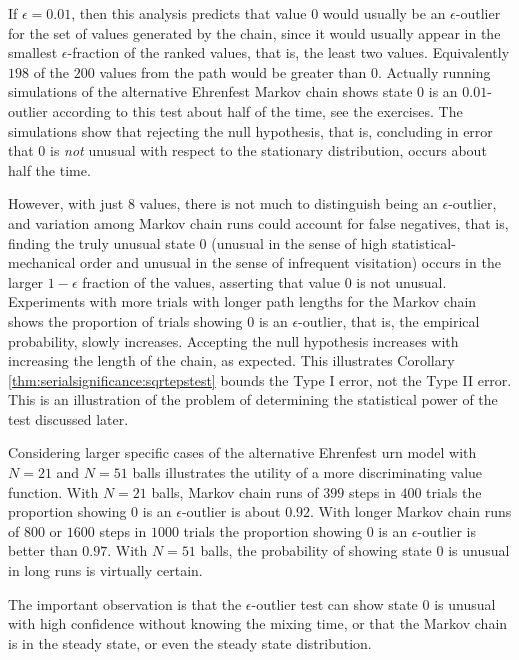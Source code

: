 \documentclass[12pt]{article}
\begin{document}
\begin{example}
    If \( \epsilon = 0.01 \), then this analysis predicts that value \(
    0 \) would usually be an \( \epsilon \)-outlier for the set of
    values generated by the chain, since it would usually appear in the
    smallest \( \epsilon \)-fraction of the ranked values, that is, the
    least two values.  Equivalently \( 198 \) of the \( 200 \) values
    from the path would be greater than \( 0 \).  Actually running
    simulations of the alternative Ehrenfest Markov chain shows state \(
    0 \) is an \( 0.01 \)-outlier according to this test about half of
    the time, see the exercises.  The simulations show that rejecting
    the null hypothesis, that is, concluding in error that \( 0 \) is
    \emph{not} unusual with respect to the stationary distribution,
    occurs about half the time.

    However, with just \( 8 \) values, there is not much to distinguish
    being an \( \epsilon \)-outlier, and variation among Markov chain
    runs could account for false negatives, that is, finding the truly
    unusual state \( 0 \) (unusual in the sense of high
    statistical-mechanical order and unusual in the sense of infrequent
    visitation) occurs in the larger \( 1 - \epsilon \) fraction of the
    values, asserting that value \( 0 \) is not unusual. Experiments
    with more trials with longer path lengths for the Markov chain shows
    the proportion of trials showing \( 0 \) is an \( \epsilon \)-outlier,
    that is, the empirical probability, slowly increases.  Accepting the
    null hypothesis increases with increasing the length of the chain,
    as expected.  This illustrates Corollary~%
    \ref{thm:serialsignificance:sqrtepstest} bounds the Type I error, not the
    Type II error.  This is an illustration of the problem of
    determining the statistical power of the test discussed later.

    Considering larger specific cases of the alternative Ehrenfest urn
    model%
    with \( N = 21 \) and \( N = 51 \) balls illustrates the utility of
    a more discriminating value function.  With \( N = 21 \) balls,
    Markov chain runs of \( 399 \) steps in \( 400 \) trials the
    proportion showing \( 0 \) is an \( \epsilon \)-outlier is about \(
    0.92 \).  With longer Markov chain runs of \( 800 \) or \( 1600 \)
    steps in \( 1000 \) trials the proportion showing \( 0 \) is an \(
    \epsilon \)-outlier is better than \( 0.97 \).  With \( N = 51 \)
    balls, the probability of showing state \( 0 \) is unusual in long
    runs is virtually certain.

    The important observation is that the \( \epsilon \)-outlier test
    can show state \( 0 \) is unusual with high confidence without
    knowing the mixing time, or that the Markov chain is in the steady
    state, or even the steady state distribution.

\end{example}
\end{document}
